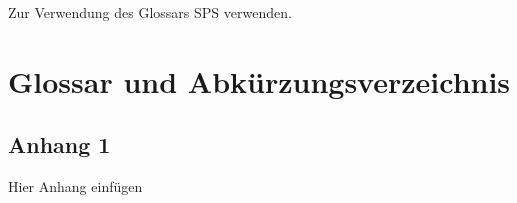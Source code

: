 \documentclass[12pt]{extarticle}
\renewcommand*{\listoffigures}{%
  \begingroup
  \tocchapter
  \tocfile{\listfigurename}{lof}
  \endgroup
  
  
}
\begin{document}







\newpage
\begin{spacing}{1.0}
\tableofcontents %
\newpage
\end{spacing}

\begin{spacing}{1.0}
  
  \newpage
  \end{spacing}

\listoffigures
\newpage

\listoftables
\newpage

\lstlistoflistings 

\newpage
\thispagestyle{empty}
\cleardoublepage


\pagestyle{fancy}
\fancyhf{}
\renewcommand{\headrulewidth}{0.4pt} %
\renewcommand{\sectionmark}[1]{\markright{\arabic{section}.\ #1}}
\renewcommand{\subsectionmark}[1]{}

\renewcommand{\footrulewidth}{0.4pt}%

\fancyhead[LE, RO]{\rightmark}

\fancyfoot[LE, RO]{\thepage}%







Zur Verwendung des Glossars \gls{SPS} verwenden.

\clearpage
\newpage

 {}
\renewcommand \refname{Glossar} \section*{Glossar und Abkürzungsverzeichnis}
\renewcommand{\glossarysection}[2][]{}
\printglossary[type=main,nonumberlist]


\newpage
\printbibliography
% 
% 

\begin{appendix}

\section{Anhang 1}
Hier Anhang einfügen

\end{appendix}
\end{document}
